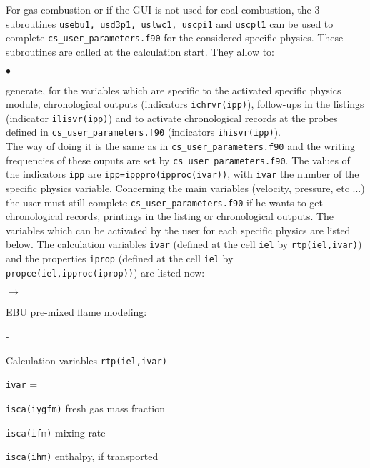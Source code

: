 {{{For gas combustion or if the GUI is not used for coal combustion, the 3 subroutines \texttt{usebu1, usd3p1, uslwc1, uscpi1} and \texttt{uscpl1} can be used to complete \texttt{cs\_user\_parameters.f90} for the
considered specific physics. These subroutines are called at the calculation start.
They allow to:
\begin{list}{$\bullet$}{}
\item generate, for the variables which are specific to the activated
             specific physics module, chronological outputs (indicators
             \texttt{ichrvr(ipp)}), follow-ups in the listings
             (indicator \texttt{ilisvr(ipp)}) and to activate
             chronological records at the probes defined in
             \texttt{cs\_user\_parameters.f90} (indicators \texttt{ihisvr(ipp)}).\\
The way of doing it is the same as in \texttt{cs\_user\_parameters.f90} and the writing
      frequencies of these ouputs are set by \texttt{cs\_user\_parameters.f90}. The values
      of the indicators \texttt{ipp} are
      \texttt{ipp=ipppro(ipproc(ivar))}, with \texttt{ivar}
      the number of the specific physics variable.
Concerning the main variables (velocity, pressure, etc ...) the user
      must still complete \texttt{cs\_user\_parameters.f90} if he wants to get
      chronological records, printings in the listing or chronological
      outputs.
The variables which can be activated by the user for each specific
      physics are listed below. The calculation variables \texttt{ivar} (defined
      at the cell \texttt{iel} by \texttt{rtp(iel,ivar)}) and the properties
      \texttt{iprop} (defined at the cell \texttt{iel} by
      \texttt{propce(iel,ipproc(iprop))}) are listed now:
      \begin{list}{$\rightarrow$}{}
       \item EBU pre-mixed flame modeling:
       \begin{list}{-}{}
        \item Calculation variables \texttt{rtp(iel,ivar)}
              \begin{list}{\texttt{ivar} = }{}
               \item \texttt{isca(iygfm)} fresh gas mass fraction
               \item \texttt{isca(ifm)} mixing rate
               \item \texttt{isca(ihm)} enthalpy, if transported
              \end{list}

\end{list}
\end{list}
\end{list}}}}
